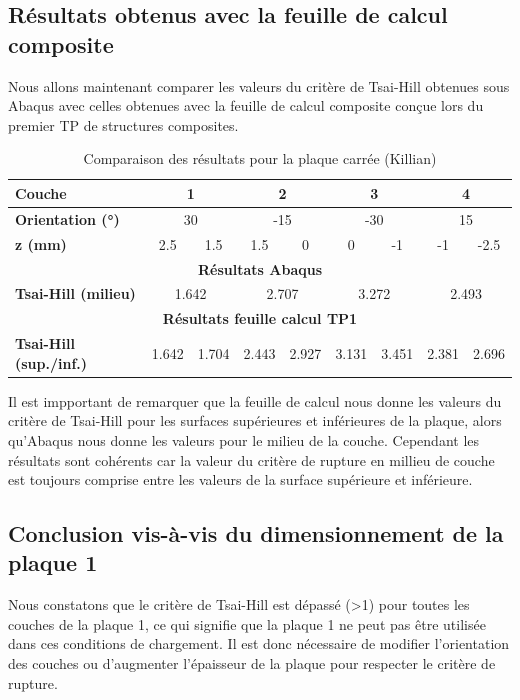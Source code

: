 \documentclass[a4paper,12pt]{article}
\begin{document}
\subsection{Résultats obtenus avec la feuille de calcul composite}
Nous allons maintenant comparer les valeurs du critère de Tsai-Hill obtenues sous Abaqus avec celles obtenues avec la feuille de calcul composite conçue lors du premier TP de structures composites.

\begin{table}[h]
	\centering
	\begin{tabular}{|l|c|c|c|c|c|c|c|c|}
	\hline
	\textbf{Couche} & \multicolumn{2}{c|}{1} & \multicolumn{2}{c|}{2} & \multicolumn{2}{c|}{3} & \multicolumn{2}{c|}{4} \\ \hline
	\textbf{Orientation (°)} & \multicolumn{2}{c|}{30} & \multicolumn{2}{c|}{-15} & \multicolumn{2}{c|}{-30} & \multicolumn{2}{c|}{15} \\ \hline
	\textbf{z (mm)} & 2.5 & 1.5 & 1.5 & 0 & 0 & -1 & -1 & -2.5 \\ \hline
	\multicolumn{9}{|c|}{\textbf{Résultats Abaqus}} \\ \hline
	\textbf{Tsai-Hill (milieu)} & \multicolumn{2}{c|}{1.642} & \multicolumn{2}{c|}{2.707} & \multicolumn{2}{c|}{3.272} & \multicolumn{2}{c|}{2.493} \\ \hline
	\multicolumn{9}{|c|}{\textbf{Résultats feuille calcul TP1}} \\ \hline
	\textbf{Tsai-Hill (sup./inf.)} & 1.642 & 1.704 & 2.443 & 2.927 & 3.131 & 3.451 & 2.381 & 2.696 \\ \hline
	\end{tabular}
	\caption{Comparaison des résultats pour la plaque carrée (Killian)}
	\label{fig:Comparaison plaque carrée}
\end{table}

Il est impportant de remarquer que la feuille de calcul nous donne les valeurs du critère de Tsai-Hill pour les surfaces supérieures et inférieures de la plaque, alors qu'Abaqus nous donne les valeurs pour le milieu de la couche. Cependant les résultats sont cohérents car la valeur du critère de rupture en millieu de couche est toujours comprise entre les valeurs de la surface supérieure et inférieure. 

\subsection{Conclusion vis-à-vis du dimensionnement de la plaque 1}
Nous constatons que le critère de Tsai-Hill est dépassé (>1) pour toutes les couches de la plaque 1, ce qui signifie que la plaque 1 ne peut pas être utilisée dans ces conditions de chargement. Il est donc nécessaire de modifier l'orientation des couches ou d'augmenter l'épaisseur de la plaque pour respecter le critère de rupture.
\end{document}
